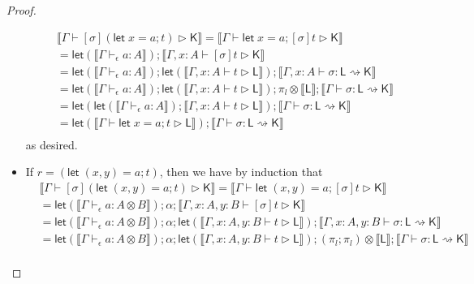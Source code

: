 \documentclass[acmsmall,screen,review]{acmart}
\newcommand{\ms}[1]{\ensuremath{\mathsf{#1}}}
\newcommand{\letstmt}[3]{\ensuremath{\ms{let}\;#1 = #2; #3}}
\newcommand{\bhyp}[2]{#1 : #2}
\newcommand{\hasty}[4]{#1 \vdash_{#2} #3: {#4}}
\newcommand{\haslb}[3]{#1 \vdash #2 \rhd #3}
\newcommand{\lbsubst}[4]{#1 \vdash #2: #3 \rightsquigarrow #4}
\newcommand{\dnt}[1]{\llbracket{#1}\rrbracket}
\newcommand{\lmor}[1]{\ms{let}(#1)}
\begin{document}
\begin{proof}
\begin{itemize}[leftmargin=*]
\begin{equation}
      \begin{aligned}
        & \dnt{\haslb{\Gamma}{[\sigma](\letstmt{x}{a}{t})}{\ms{K}}} 
          = \dnt{\haslb{\Gamma}{\letstmt{x}{a}{[\sigma]t}}{\ms{K}}} \\
        & = \lmor{\dnt{\hasty{\Gamma}{\epsilon}{a}{A}}}
          ; \dnt{\haslb{\Gamma, \bhyp{x}{A}}{[\sigma]t}{\ms{K}}} \\
        & = \lmor{\dnt{\hasty{\Gamma}{\epsilon}{a}{A}}}
          ; \lmor{\dnt{\haslb{\Gamma, \bhyp{x}{A}}{t}{\ms{L}}}}
          ; \dnt{\lbsubst{\Gamma, \bhyp{x}{A}}{\sigma}{\ms{L}}{\ms{K}}} \\
        & = \lmor{\dnt{\hasty{\Gamma}{\epsilon}{a}{A}}}
          ; \lmor{\dnt{\haslb{\Gamma, \bhyp{x}{A}}{t}{\ms{L}}}}
          ; \pi_l \otimes \dnt{\ms{L}} 
          ; \dnt{\lbsubst{\Gamma}{\sigma}{\ms{L}}{\ms{K}}} \\
        & = \lmor{
            \lmor{\dnt{\hasty{\Gamma}{\epsilon}{a}{A}}}
            ; \dnt{\haslb{\Gamma, \bhyp{x}{A}}{t}{\ms{L}}}
          }
          ; \dnt{\lbsubst{\Gamma}{\sigma}{\ms{L}}{\ms{K}}} \\
        & = \lmor{\dnt{\haslb{\Gamma}{\letstmt{x}{a}{t}}{\ms{L}}}}
          ; \dnt{\lbsubst{\Gamma}{\sigma}{\ms{L}}{\ms{K}}} \\
      \end{aligned}
    \end{equation}
    as desired.
    \item If $r = (\letstmt{(x, y)}{a}{t})$, then we have by induction that
    \begin{equation}
      \begin{aligned}
        & \dnt{\haslb{\Gamma}{[\sigma](\letstmt{(x, y)}{a}{t})}{\ms{K}}} 
          = \dnt{\haslb{\Gamma}{\letstmt{(x, y)}{a}{[\sigma]t}}{\ms{K}}} \\
        & = \lmor{\dnt{\hasty{\Gamma}{\epsilon}{a}{A \otimes B}}} ; \alpha
          ; \dnt{\haslb{\Gamma, \bhyp{x}{A}, \bhyp{y}{B}}{[\sigma]t}{\ms{K}}} \\
        & = \lmor{\dnt{\hasty{\Gamma}{\epsilon}{a}{A \otimes B}}} ; \alpha
          ; \lmor{\dnt{\haslb{\Gamma, \bhyp{x}{A}, \bhyp{y}{B}}{t}{\ms{L}}}}
          ; \dnt{\lbsubst{\Gamma, \bhyp{x}{A}, \bhyp{y}{B}}{\sigma}{\ms{L}}{\ms{K}}} \\
          & = \lmor{\dnt{\hasty{\Gamma}{\epsilon}{a}{A \otimes B}}} ; \alpha
            ; \lmor{\dnt{\haslb{\Gamma, \bhyp{x}{A}, \bhyp{y}{B}}{t}{\ms{L}}}}
            ; (\pi_l ; \pi_l) \otimes \dnt{\ms{L}}
            ; \dnt{\lbsubst{\Gamma}{\sigma}{\ms{L}}{\ms{K}}} \\

\end{aligned}
\end{equation}
\end{itemize}
\end{proof}
\end{document}
